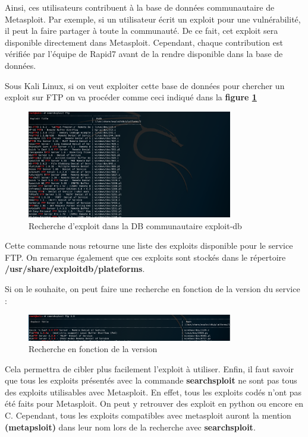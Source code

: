Ainsi, ces utilisateurs contribuent à la base de données communautaire de Metasploit. Par exemple, si un utilisateur écrit un exploit pour une vulnérabilité, il peut la faire partager à toute la communauté. De ce fait, cet exploit sera disponible directement dans Metasploit. Cependant, chaque contribution est vérifiée par l'équipe de Rapid7 avant de la rendre disponible dans la base de données.

Sous Kali Linux, si on veut exploiter cette base de données pour chercher un exploit sur FTP on va procéder comme ceci indiqué dans la \textbf{figure \ref{fig:exploit-db}}

\begin{figure}[htp]
  \centering
  \setlength\figureheight{7cm}
  \setlength\figurewidth{9cm}
  \includegraphics[width=0.8\textwidth]{oui/Ancien/imangeancien/metasploit/searchsploit-ex.PNG}
  \caption{Recherche d'exploit dans la DB communautaire exploit-db}
  \label{fig:exploit-db}
\end{figure}

 Cette commande nous retourne une liste des exploits disponible pour le service FTP. On remarque également que ces exploits sont stockés dans le répertoire \textbf{/usr/share/exploitdb/plateforms}.

 Si on le souhaite, on peut faire une recherche en fonction de la version du service :
\begin{figure}[htp!]
  \centering
  \setlength\figureheight{7cm}
  \setlength\figurewidth{9cm}
  \includegraphics[width=0.8\textwidth]{oui/Ancien/imangeancien/metasploit/searchsploit-ex2.PNG}
  \caption{Recherche en fonction de la version}
  \label{fig:courbe-tikz}
\end{figure}

     Cela permettra de cibler plus facilement l'exploit à utiliser. Enfin, il faut savoir que tous les exploits présentés avec la commande \textbf{searchsploit} ne sont pas tous des exploits utilisables avec Metasploit. En effet, tous les exploits codés n'ont pas été faits pour Metasploit. On peut y retrouver des exploit en python ou encore en C. Cependant, tous les exploits compatibles avec metasploit auront la mention \textbf{(metapsloit)} dans leur nom lors de la recherche avec \textbf{searchsploit}. 

